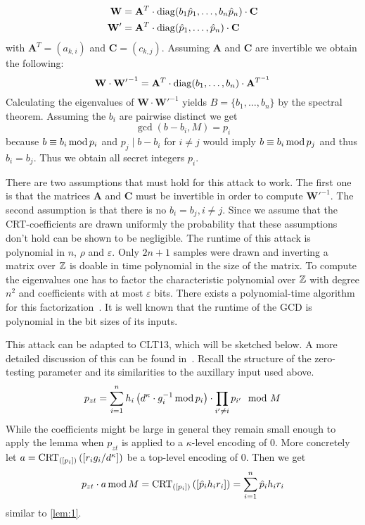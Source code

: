 \documentclass[english]{scrartcl}
\theoremstyle{plain}
\theoremstyle{definition}
\begin{document}
    \begin{align*}
        \mathbf{W} &= \mathbf{A}^T \cdot \operatorname{diag}(b_1 \hat{p}_1, \dots, b_n \hat{p}_n) \cdot \mathbf{C} \\
        \mathbf{W'} &= \mathbf{A}^T \cdot \operatorname{diag}(\hat{p}_1, \dots, \hat{p}_n) \cdot \mathbf{C}
    \end{align*}
    with $\mathbf{A}^T = (a_{k,i})$ and $\mathbf{C} = (c_{k,j})$.
    Assuming $\mathbf{A}$ and $\mathbf{C}$ are invertible we obtain the following:
    \begin{equation*}
        \mathbf{W} \cdot \mathbf{W'}^{-1} = \mathbf{A}^T \cdot \operatorname{diag}(b_1, \dots, b_n) \cdot \mathbf{A}^{T^{-1}}
    \end{equation*}
    Calculating the eigenvalues of $\mathbf{W} \cdot \mathbf{W'}^{-1}$ yields $B = \{b_1, \dots, b_n\}$ by the spectral theorem.
    Assuming the $b_i$ are pairwise distinct we get
    \begin{equation*}
        \gcd(b - b_i, M) = p_i
    \end{equation*}
    because $b \equiv b_i \operatorname{mod}{p_i}$ and $p_j \mid b - b_i $ for $i \neq j$ would imply $b \equiv b_i \operatorname{mod}{p_j}$ and thus $b_i = b_j$. Thus we obtain all secret integers $p_i$.

    There are two assumptions that must hold for this attack to work. The first one is that the matrices $\mathbf{A}$ and $\mathbf{C}$ must be invertible in order to compute $\mathbf{W'}^{-1}$. The second assumption is that there is no $b_i = b_j, i \neq j$. Since we assume that the CRT-coefficients are drawn uniformly the probability that these assumptions don't hold can be shown to be negligible.
    The runtime of this attack is polynomial in $n$, $\rho$ and $\varepsilon$. Only $2n+1$ samples were drawn and inverting a matrix over $\mathbb{Z}$ is doable in time polynomial in the size of the matrix.
    To compute the eigenvalues one has to factor the characteristic polynomial over $\mathbb{Z}$ with degree $n^2$ and coefficients with at most $\varepsilon$ bits. There exists a polynomial-time algorithm for this factorization~\cite{lenstra1982factoring}. It is well known that the runtime of the GCD is polynomial in the bit sizes of its inputs.

    This attack can be adapted to CLT13, which will be sketched below. A more detailed discussion of this can be found in~\cite{cryptoeprint:2014:906}.
    Recall the structure of the zero-testing parameter and its similarities to the auxillary input used above.
    \begin{equation*}
        p_{zt} = \sum_{i=1}^n h_i \left(d^\kappa \cdot g_i^{-1} \operatorname{mod} p_i\right) \cdot \prod_{i' \neq i} p_{i'} \mod M
    \end{equation*}
    While the coefficients might be large in general they remain small enough to apply the lemma when $p_{zt}$ is applied to a $\kappa$-level encoding of 0.
    More concretely let $a = \operatorname{CRT}_{([p_{i}])}\left(\left[r_i g_i / d^\kappa\right]\right)$ be a top-level encoding of 0. Then we get
    \begin{equation}\label{eq:CHLRS_clt13}
        p_{zt} \cdot a \operatorname{mod} M = \operatorname{CRT}_{([p_{i}])}\left(\left[\hat{p}_i h_i r_i\right]\right) = \sum_{i = 1}^n \hat{p}_i h_i r_i
    \end{equation}
    similar to \cref{lem:1}.
\end{document}
